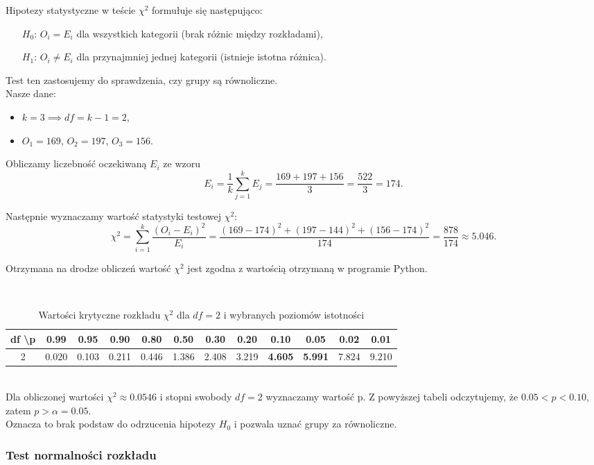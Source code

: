 \documentclass[12pt,a4paper]{article}
\begin{document}
Hipotezy statystyczne w teście $\chi^2$ formułuje się następująco:

\begin{itemize}
    \item[$H_0$:] $O_i = E_i$ dla wszystkich kategorii (brak różnic między rozkładami),
    \item[$H_1$:] $O_i \neq E_i$ dla przynajmniej jednej kategorii (istnieje istotna różnica).
\end{itemize}

Test ten zastosujemy do sprawdzenia, czy grupy są równoliczne.
\\
Nasze dane:
\begin{itemize}
    \item $k=3 \implies df=k-1=2$,
    \item $O_1=169$, $O_2= 197$, $O_3=156$.
\end{itemize}
Obliczamy liczebność oczekiwaną $E_i$ ze wzoru $$E_i=\frac{1}{k}\sum_{j=1}^{k}E_j=\frac{169+197+156}{3}=\frac{522}{3}=174.$$

Następnie wyznaczamy wartość statystyki testowej $\chi^2$:
$$\chi^2 = \sum_{i=1}^{k} \frac{(O_i - E_i)^2}{E_i}= \frac{(169-174)^2+(197-144)^2+(156-174)^2}{174}= \frac{878}{174}\approx5.046.$$

Otrzymana na drodze obliczeń wartość $\chi^2$ jest zgodna z wartością otrzymaną w programie Python.


\\

\begin{table}[H]
\caption{Wartości krytyczne rozkładu $\chi^2$ dla $df = 2$ i wybranych poziomów istotności}
\begin{tabular}{|c|ccccccccccc|}
\hline
\textbf{df} \textbackslash \textbf{p} & 0.99 & 0.95 & 0.90 & 0.80 & 0.50 & 0.30 & 0.20 & \textbf{0.10} & \textbf{0.05} & 0.02 & 0.01 \\
\hline
2 & 0.020 & 0.103 & 0.211 & 0.446 & 1.386 & 2.408 & 3.219 & \textbf{4.605} & \textbf{5.991} & 7.824 & 9.210 \\
\hline
\end{tabular}
\end{table}
\\
Dla obliczonej wartości $\chi^2\approx0.0546$ i stopni swobody $df=2$ wyznaczamy wartość p. Z powyższej tabeli odczytujemy, że $0.05<p<0.10$, zatem $p>\alpha=0.05.$ \\Oznacza to brak podstaw do odrzucenia hipotezy $H_0$ i pozwala uznać grupy za równoliczne.

\subsubsection{Test normalności rozkładu}
\end{document}
